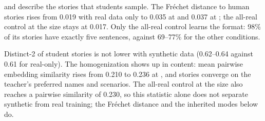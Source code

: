 \begin{table}[t]
    \centering
    \caption{Properties of 500 sampled student stories (mean over seeds). The Fr\'echet distance reported for human stories is the noise floor of the estimate. Values closest to human stories among trained students in \textbf{bold}.}
    \label{tab:creative}
\end{table}

 and  describe the stories that students sample.
The Fr\'echet distance to human stories rises from 0.019 with real data only to 0.035 at  and 0.037 at ; the all-real control at the  size stays at 0.017.
Only the all-real control learns the format: 98\% of its stories have exactly five sentences, against 69--77\% for the other conditions.

 Distinct-2 of student stories is not lower with synthetic data (0.62--0.64 against 0.61 for real-only).
The homogenization shows up in content: mean pairwise embedding similarity rises from 0.210 to 0.236 at , and stories converge on the teacher's preferred names and scenarios.
The all-real control at the  size also reaches a pairwise similarity of 0.230, so this statistic alone does not separate synthetic from real training; the Fr\'echet distance and the inherited modes below do.

